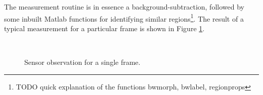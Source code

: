 The measurement routine is in essence a background-subtraction, followed by some
inbuilt Matlab functions for identifying similar regions\footnote{TODO quick
explanation of the functions bwmorph, bwlabel, regionprops}. The result of a
typical measurement for a particular frame is shown in Figure \ref{fig:observation}.

\begin{figure}[h]
\centering
{}
 \\
\caption{Sensor observation for a single frame.}
\label{fig:observation}
\end{figure}

